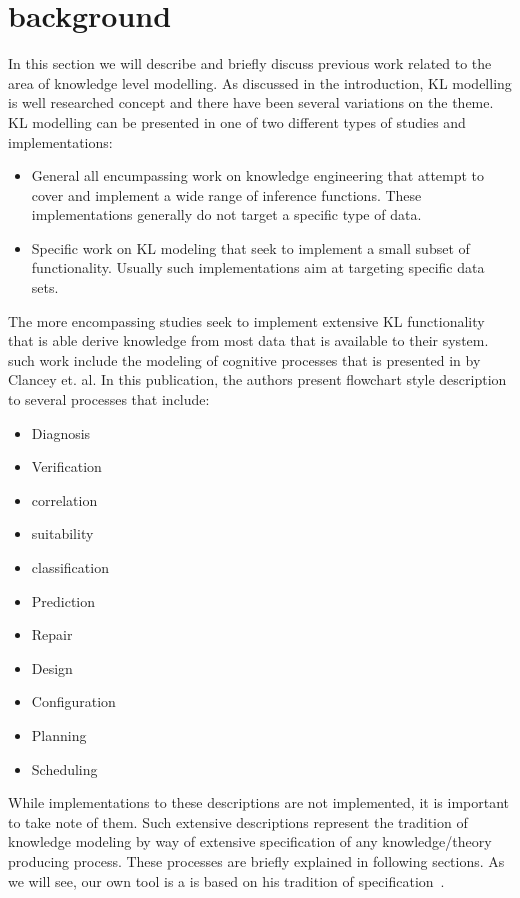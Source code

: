 \section{background}
In this section we will describe and briefly discuss previous work related to the area of knowledge level modelling. As discussed in the introduction, KL modelling is well researched concept and there have been several variations on the theme. KL modelling can be presented in one of two different types of studies and implementations: 

\begin{itemize}
	\item General all encumpassing work on knowledge engineering that attempt to cover and implement a wide range of inference functions. These implementations generally do not target a specific type of data.
	\item Specific work on KL modeling that seek to implement a small subset of functionality. Usually such implementations aim at targeting specific data sets.
\end{itemize}

The more encompassing studies seek to implement extensive KL functionality that is able derive knowledge from most data that is available to their system. such work include the modeling of cognitive processes that is presented in \cite{Clancey1985} by Clancey et. al. In this publication, the authors present flowchart style description to several processes that include:

\begin{itemize}
	\item Diagnosis
	\item Verification
	\item correlation
	\item suitability
	\item classification
	\item Prediction
	\item Repair
	\item Design
	\item Configuration
	\item Planning
	\item Scheduling
\end{itemize}

While implementations to these descriptions are not implemented, it is important to take note of them. Such extensive descriptions represent the tradition of knowledge modeling by way of extensive specification of any knowledge/theory producing process. These processes are briefly explained in following sections. As we will see, our own tool is a is based on his tradition of specification~\cite{riesbeck96}.

